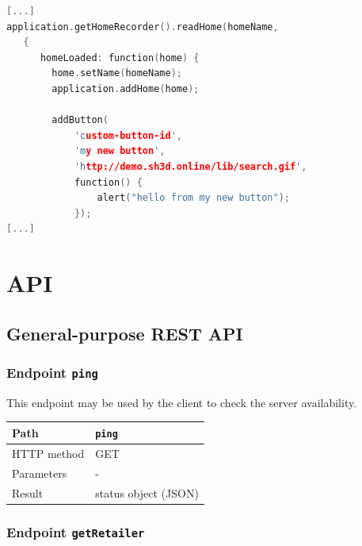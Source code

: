 \documentclass[a4paper]{report}
\begin{document}
\begin{lstlisting}[language=c++]
[...]
application.getHomeRecorder().readHome(homeName, 
   {
      homeLoaded: function(home) {
        home.setName(homeName);
        application.addHome(home);

        addButton(
        	'custom-button-id', 
        	'my new button', 
        	'http://demo.sh3d.online/lib/search.gif', 
        	function() {
	        	alert("hello from my new button");
    	    });
[...]
\end{lstlisting}

\chapter{API}

\section{General-purpose REST API}

\subsection{Endpoint \texttt{ping}}

This endpoint may be used by the client to check the server availability.

\begin{center}
\begin{tabularx} {\textwidth} { | l | X | }

\hline

Path & \texttt{ping} \\

\hline

HTTP method & GET \\

\hline

Parameters & - \\

\hline

Result & status object (JSON) \\

\hline

\end{tabularx}
\end{center}

\subsection{Endpoint \texttt{getRetailer}}
\end{document}
